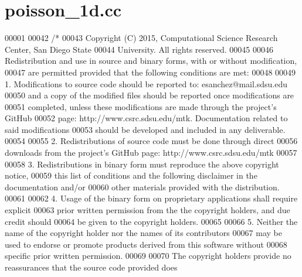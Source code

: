 \hypertarget{poisson__1d_8cc_source}{\section{poisson\+\_\+1d.\+cc}
\label{poisson__1d_8cc_source}
}

\begin{DoxyCode}
00001 
00042 \textcolor{comment}{/*}
00043 \textcolor{comment}{Copyright (C) 2015, Computational Science Research Center, San Diego State}
00044 \textcolor{comment}{University. All rights reserved.}
00045 \textcolor{comment}{}
00046 \textcolor{comment}{Redistribution and use in source and binary forms, with or without modification,}
00047 \textcolor{comment}{are permitted provided that the following conditions are met:}
00048 \textcolor{comment}{}
00049 \textcolor{comment}{1. Modifications to source code should be reported to: esanchez@mail.sdsu.edu}
00050 \textcolor{comment}{and a copy of the modified files should be reported once modifications are}
00051 \textcolor{comment}{completed, unless these modifications are made through the project's GitHub}
00052 \textcolor{comment}{page: http://www.csrc.sdsu.edu/mtk. Documentation related to said modifications}
00053 \textcolor{comment}{should be developed and included in any deliverable.}
00054 \textcolor{comment}{}
00055 \textcolor{comment}{2. Redistributions of source code must be done through direct}
00056 \textcolor{comment}{downloads from the project's GitHub page: http://www.csrc.sdsu.edu/mtk}
00057 \textcolor{comment}{}
00058 \textcolor{comment}{3. Redistributions in binary form must reproduce the above copyright notice,}
00059 \textcolor{comment}{this list of conditions and the following disclaimer in the documentation and/or}
00060 \textcolor{comment}{other materials provided with the distribution.}
00061 \textcolor{comment}{}
00062 \textcolor{comment}{4. Usage of the binary form on proprietary applications shall require explicit}
00063 \textcolor{comment}{prior written permission from the the copyright holders, and due credit should}
00064 \textcolor{comment}{be given to the copyright holders.}
00065 \textcolor{comment}{}
00066 \textcolor{comment}{5. Neither the name of the copyright holder nor the names of its contributors}
00067 \textcolor{comment}{may be used to endorse or promote products derived from this software without}
00068 \textcolor{comment}{specific prior written permission.}
00069 \textcolor{comment}{}
00070 \textcolor{comment}{The copyright holders provide no reassurances that the source code provided does}

\end{DoxyCode}
